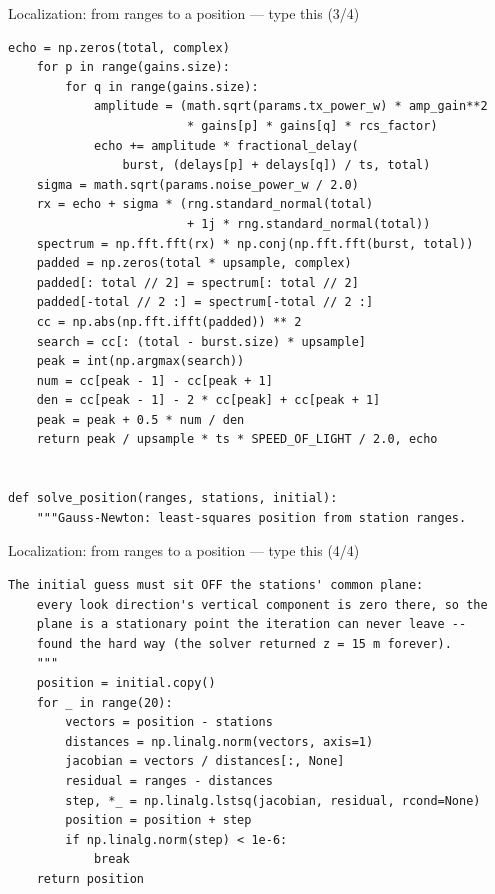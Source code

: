 \documentclass[10pt]{beamer}
\begin{document}
\begin{frame}[fragile]{Localization: from ranges to a position --- type this (3/4)}
\begin{lstlisting}[basicstyle=\ttfamily\tiny]
    echo = np.zeros(total, complex)
    for p in range(gains.size):
        for q in range(gains.size):
            amplitude = (math.sqrt(params.tx_power_w) * amp_gain**2
                         * gains[p] * gains[q] * rcs_factor)
            echo += amplitude * fractional_delay(
                burst, (delays[p] + delays[q]) / ts, total)
    sigma = math.sqrt(params.noise_power_w / 2.0)
    rx = echo + sigma * (rng.standard_normal(total)
                         + 1j * rng.standard_normal(total))
    spectrum = np.fft.fft(rx) * np.conj(np.fft.fft(burst, total))
    padded = np.zeros(total * upsample, complex)
    padded[: total // 2] = spectrum[: total // 2]
    padded[-total // 2 :] = spectrum[-total // 2 :]
    cc = np.abs(np.fft.ifft(padded)) ** 2
    search = cc[: (total - burst.size) * upsample]
    peak = int(np.argmax(search))
    num = cc[peak - 1] - cc[peak + 1]
    den = cc[peak - 1] - 2 * cc[peak] + cc[peak + 1]
    peak = peak + 0.5 * num / den
    return peak / upsample * ts * SPEED_OF_LIGHT / 2.0, echo


def solve_position(ranges, stations, initial):
    """Gauss-Newton: least-squares position from station ranges.
\end{lstlisting}
\end{frame}

\begin{frame}[fragile]{Localization: from ranges to a position --- type this (4/4)}
\begin{lstlisting}[basicstyle=\ttfamily\tiny]
    The initial guess must sit OFF the stations' common plane:
    every look direction's vertical component is zero there, so the
    plane is a stationary point the iteration can never leave --
    found the hard way (the solver returned z = 15 m forever).
    """
    position = initial.copy()
    for _ in range(20):
        vectors = position - stations
        distances = np.linalg.norm(vectors, axis=1)
        jacobian = vectors / distances[:, None]
        residual = ranges - distances
        step, *_ = np.linalg.lstsq(jacobian, residual, rcond=None)
        position = position + step
        if np.linalg.norm(step) < 1e-6:
            break
    return position
\end{lstlisting}
\end{frame}
\end{document}
